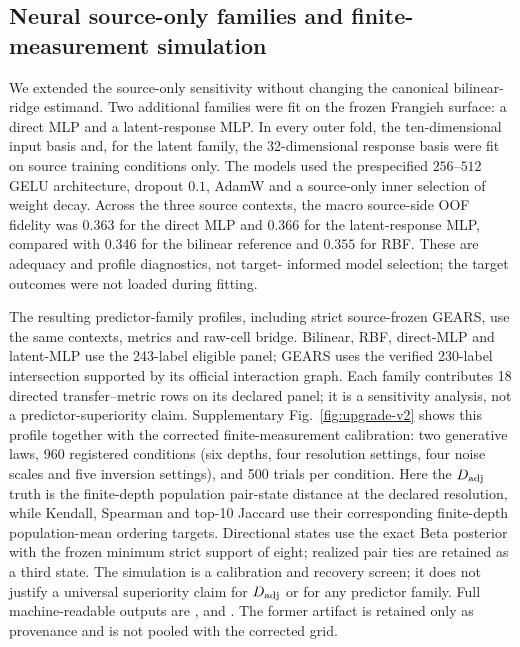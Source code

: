 \documentclass{article}
\begin{document}
\subsection{Neural source-only families and finite-measurement simulation}

We extended the source-only sensitivity without changing the canonical
bilinear-ridge estimand. Two additional families were fit on the frozen
Frangieh surface: a direct MLP and a latent-response MLP. In every outer fold,
the ten-dimensional input basis and, for the latent family, the 32-dimensional
response basis were fit on source training conditions only. The models used
the prespecified $256$--$512$ GELU architecture, dropout $0.1$, AdamW and a
source-only inner selection of weight decay. Across the three source contexts,
the macro source-side OOF fidelity was $0.363$ for the direct MLP and $0.366$
for the latent-response MLP, compared with $0.346$ for the bilinear reference
and $0.355$ for RBF. These are adequacy and profile diagnostics, not target-
informed model selection; the target outcomes were not loaded during fitting.

The resulting predictor-family profiles, including strict source-frozen GEARS,
use the same contexts, metrics and raw-cell bridge. Bilinear, RBF, direct-MLP
and latent-MLP use the 243-label eligible panel; GEARS uses the verified
230-label intersection supported by its official interaction graph. Each
family contributes 18 directed transfer--metric rows on its declared panel;
it is a sensitivity analysis, not a predictor-superiority claim. Supplementary
Fig.~\ref{fig:upgrade-v2} shows this profile together with the corrected
finite-measurement calibration: two generative laws, 960 registered
conditions (six depths, four resolution settings, four noise scales and five
inversion settings), and 500 trials per condition. Here the $D_{\rm adj}$
truth is the finite-depth population pair-state distance at the declared
resolution, while Kendall, Spearman and top-10 Jaccard use their corresponding
finite-depth population-mean ordering targets. Directional states use the
exact Beta posterior with the frozen minimum strict support of eight; realized
pair ties are retained as a third state. The simulation is a calibration and
recovery screen; it does not justify a universal superiority claim for
$D_{\rm adj}$ or for any predictor family. Full machine-readable outputs are
,
 and
. The former
 artifact is retained only as provenance and is not
pooled with the corrected grid.
\end{document}
